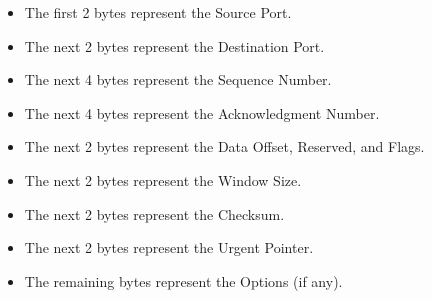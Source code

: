 \documentclass{article}
\begin{document}
\begin{flushleft}
    \begin{itemize}
        \item The first 2 bytes represent the Source Port.
        \item The next 2 bytes represent the Destination Port.
        \item The next 4 bytes represent the Sequence Number.
        \item The next 4 bytes represent the Acknowledgment Number.
        \item The next 2 bytes represent the Data Offset, Reserved, and Flags.
        \item The next 2 bytes represent the Window Size.
        \item The next 2 bytes represent the Checksum.
        \item The next 2 bytes represent the Urgent Pointer.
        \item The remaining bytes represent the Options (if any).
    \end{itemize}



        

\end{flushleft}
\end{document}
